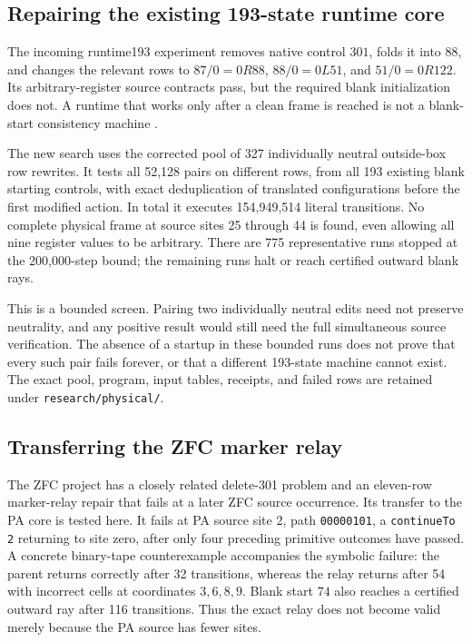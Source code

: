 \documentclass[11pt,letterpaper]{article}
\newcommand{\file}[1]{\begingroup\def\UrlBreaks{\do\/\do\_\do\-\do\.}\texttt{\nolinkurl{#1}}\endgroup}
\begin{document}
\subsection{Repairing the existing 193-state runtime core}

The incoming runtime193 experiment removes native control $301$, folds it into
$88$, and changes the relevant rows to
$87/0=0R88$, $88/0=0L51$, and $51/0=0R122$.
Its arbitrary-register source contracts pass, but the required blank
initialization does not. A runtime that works only after a clean frame is
reached is not a blank-start consistency machine \cite{runtime193}.

The new search uses the corrected pool of 327 individually neutral outside-box
row rewrites. It tests all 52,128 pairs on different rows, from all 193 existing
blank starting controls, with exact deduplication of translated configurations
before the first modified action. In total it executes 154,949,514 literal
transitions. No complete physical frame at source sites 25 through 44 is found,
even allowing all nine register values to be arbitrary. There are 775
representative runs stopped at the 200,000-step bound; the remaining runs halt
or reach certified outward blank rays.

This is a bounded screen. Pairing two individually neutral edits need not preserve
neutrality, and any positive result would still need the full simultaneous
source verification. The absence of a startup in these bounded runs does not
prove that every such pair fails forever, or that a different 193-state machine
cannot exist. The exact pool, program, input tables, receipts, and failed rows
are retained under \file{research/physical/}.

\subsection{Transferring the ZFC marker relay}

The ZFC project has a closely related delete-301 problem and an eleven-row
marker-relay repair that fails at a later ZFC source occurrence. Its transfer
to the PA core is tested here. It fails at PA source site 2, path
\texttt{00000101}, a \texttt{continueTo 2} returning to site zero, after only
four preceding primitive outcomes have passed. A concrete binary-tape
counterexample accompanies the symbolic failure: the parent returns correctly
after 32 transitions, whereas the relay returns after 54 with incorrect cells
at coordinates $3,6,8,9$. Blank start $74$ also reaches
a certified outward ray after 116 transitions. Thus the exact relay does not
become valid merely because the PA source has fewer sites.
\end{document}
